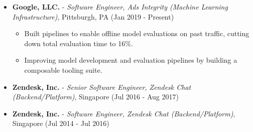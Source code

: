 \begin{itemize}
\tightlist
\item
  \textbf{Google, LLC.} - \emph{Software Engineer, Ads Integrity
  (Machine Learning Infrastructure)}, Pittsburgh, PA \hfill (Jan 2019 -
  Present)

  \begin{itemize}
  \tightlist
  \item
    Built pipelines to enable offline model evaluations on past traffic,
    cutting down total evaluation time to 16\%.
  \item
    Improving model development and evaluation pipelines by building a
    composable tooling suite.
  \end{itemize}
\item
  \textbf{Zendesk, Inc.} - \emph{Senior Software Engineer, Zendesk Chat
  (Backend/Platform)}, Singapore \hfill (Jul 2016 - Aug 2017)
\item
  \textbf{Zendesk, Inc.} - \emph{Software Engineer, Zendesk Chat
  (Backend/Platform)}, Singapore \hfill (Jul 2014 - Jul 2016)


\end{itemize}
